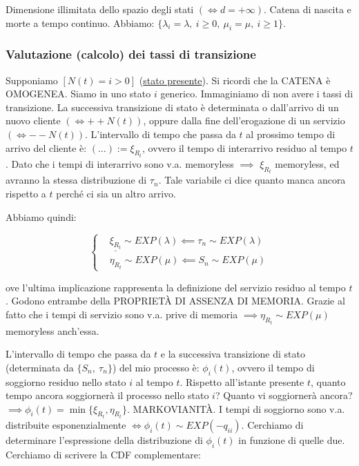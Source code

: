 Dimensione illimitata dello spazio degli stati $(\iff d=+\infty)$. Catena di nascita e morte a tempo continuo. Abbiamo: $\{\lambda_i = \lambda,\ i\geq 0,\ \mu_i = \mu,\ i\geq 1\}$.

\subsubsection{Valutazione (calcolo) dei tassi di transizione}

Supponiamo $[N(t) = i>0]$ (\underline{stato presente}). Si ricordi che la CATENA è OMOGENEA. Siamo in uno stato $i$ generico. Immaginiamo di non avere i tassi di transizione. La successiva transizione di stato è determinata o dall'arrivo di un nuovo cliente $(\iff ++N(t))$, oppure dalla fine dell'erogazione di un servizio $(\iff --N(t))$. L'intervallo di tempo che passa da $t$ al prossimo tempo di arrivo del cliente è: $ (\dots) := \xi_{R_t}$, ovvero il tempo di interarrivo residuo al tempo $t$. Dato che i tempi di interarrivo sono v.a. memoryless $\implies$ $\xi_{R_t}$ memoryless, ed avranno la stessa distribuzione di $\tau_n$. Tale variabile ci dice quanto manca ancora rispetto a $t$ perché ci sia un altro arrivo.

Abbiamo quindi:

\[
	\left\{
	\begin{aligned}
	&\underline{\xi_{R_t}} \sim EXP(\lambda) \impliedby \tau_n \sim EXP(\lambda)\\
	&\eta_{R_t} \sim EXP(\mu) \impliedby S_n \sim EXP(\mu)
	\end{aligned}
	\right.
\]

ove l'ultima implicazione rappresenta la definizione del servizio residuo al tempo $t$. Godono entrambe della PROPRIET\`A DI ASSENZA DI MEMORIA. Grazie al fatto che i tempi di servizio sono v.a. prive di memoria $\implies \eta_{R_t} \sim EXP(\mu)$ memoryless anch'essa. 

L'intervallo di tempo che passa da $t$ e la successiva transizione di stato (determinata da $\{S_n,\ \tau_n\}$) del mio processo è: $\phi_i(t)$, ovvero il tempo di soggiorno residuo nello stato $i$ al tempo $t$. Rispetto all'istante presente $t$, quanto tempo ancora soggiornerà il processo nello stato $i$? Quanto vi soggiornerà ancora? $\implies \phi_i(t) = \min\{\xi_{R_t}, \eta_{R_t}\}$. MARKOVIANIT\`A. I tempi di soggiorno sono v.a. distribuite esponenzialmente $\iff \phi_i(t) \sim EXP(-q_{ii})$. Cerchiamo di determinare l'espressione della distribuzione di $\phi_i(t)$ in funzione di quelle due. Cerchiamo di scrivere la CDF complementare:

